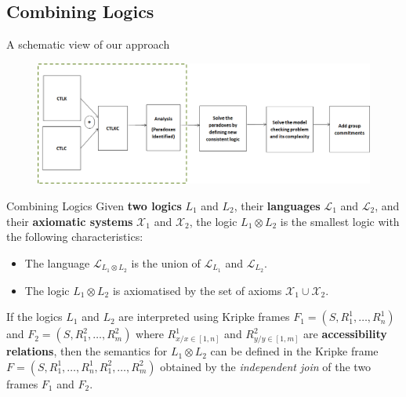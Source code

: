 \documentclass{beamer}
\begin{document}
\subsection{Combining Logics}

\begin{frame}{A schematic view of our approach}

\begin{figure}[htbp]
\centering
\includegraphics[width=1.05 \columnwidth]{figures/figure9.png}
\end{figure}

\end{frame}

    \begin{frame}{Combining Logics}
Given \textbf{two logics} $L_1$ and $L_2$, their \textbf{languages} $\mathcal{L}_1$ and $\mathcal{L}_2$, and their
\textbf{axiomatic systems} $\mathcal{X}_1$ and $\mathcal{X}_2$, the logic
$L_1 \otimes L_2$ is the smallest logic with the following
characteristics:
\begin{itemize}
  \item The language $\mathcal{L}_{L_1\otimes L_2}$ is the union of $\mathcal{L}_{L_1}$ and $\mathcal{L}_{L_2}$.
  \item The logic $L_1 \otimes L_2$ is axiomatised by the set of axioms $\mathcal{X}_1 \cup \mathcal{X}_2$.
\end{itemize}
If the logics $L_1$ and $L_2$ are interpreted using Kripke frames
$F_1 = (S, R_1^1, \dots, R_n^1)$ and $F_2 = (S, R_1^2, \dots
,R_m^2 )$ where $R^1_{x/x\in[1,n]}$ and $R^2_{y/y\in[1,m]}$ are
\textbf{accessibility relations}, then the semantics for $L_1 \otimes L_2$
can be defined in the Kripke frame $F =(S, R_1^1, \dots , R_n^1,
R_1^2, \dots ,R_m^2 )$ obtained by the \textit{independent join} of the two
frames $F_1$ and $F_2$.
    \end{frame}
\end{document}
